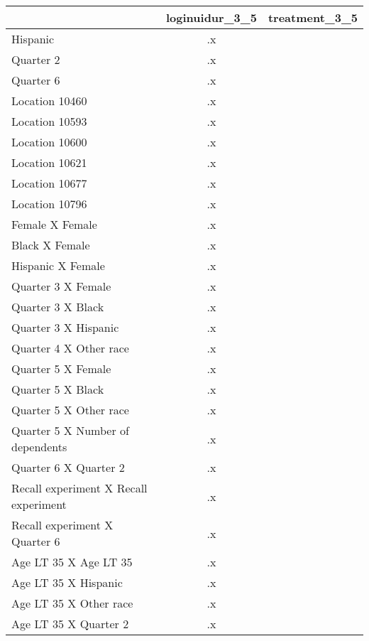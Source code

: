 \begin{tabular}{l*{2}{c}}
\hline\hline
                    &loginuidur\_3\_5&treatment\_3\_5\\
\hline
Hispanic            &          .x&            \\
Quarter 2           &          .x&            \\
Quarter 6           &          .x&            \\
Location 10460      &          .x&            \\
Location 10593      &          .x&            \\
Location 10600      &          .x&            \\
Location 10621      &          .x&            \\
Location 10677      &          .x&            \\
Location 10796      &          .x&            \\
Female X Female     &          .x&            \\
Black X Female      &          .x&            \\
Hispanic X Female   &          .x&            \\
Quarter 3 X Female  &          .x&            \\
Quarter 3 X Black   &          .x&            \\
Quarter 3 X Hispanic&          .x&            \\
Quarter 4 X Other race&          .x&            \\
Quarter 5 X Female  &          .x&            \\
Quarter 5 X Black   &          .x&            \\
Quarter 5 X Other race&          .x&            \\
Quarter 5 X Number of dependents&          .x&            \\
Quarter 6 X Quarter 2&          .x&            \\
Recall experiment X Recall experiment&          .x&            \\
Recall experiment X Quarter 6&          .x&            \\
Age LT 35 X Age LT 35&          .x&            \\
Age LT 35 X Hispanic&          .x&            \\
Age LT 35 X Other race&          .x&            \\
Age LT 35 X Quarter 2&          .x&            \\

\end{tabular}
